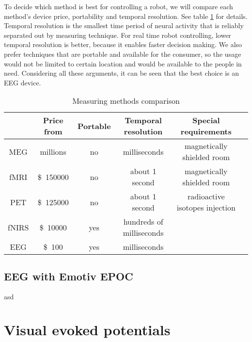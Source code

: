 To decide which method is best for controlling a robot, we will compare each method's device price, portability and temporal resolution. See table \ref{tab:measuring methods} for details. Temporal resolution is the smallest time period of neural activity that is reliably separated out by measuring technique. For real time robot controlling, lower temporal resolution is better, because it enables faster decision making. We also prefer techniques that are portable and available for the consumer, so the usage would not be limited to certain location and would be available to the people in need. Considering all these arguments, it can be seen that the best choice is an \acrshort{EEG} device.
\newpage


\newcommand{\pMEG}{\tablefootnote{http://neurogadget.com/2012/12/15/inexpensive-magnetoencephalography-meg-system-could-be-available-at-every-hospital/6495}}
\newcommand{\pfMRI}{\tablefootnote{http://info.blockimaging.com/bid/92623/MRI-Machine-Cost-and-Price-Guide}}
\newcommand{\pPET}{\tablefootnote{http://info.blockimaging.com/bid/68875/How-Much-Does-a-PET-CT-Scanner-Cost}}
\newcommand{\plEEG}{\tablefootnote{http://en.wikipedia.org/wiki/Comparison\_of\_consumer\_brain-computer\_interfaces}}
\newcommand{\phEEG}{\tablefootnote{http://www.brainvision.com/files/actiCHamp-PyCorder-Flyer\_US.pdf}}
\newcommand{\pNIRS}{\cite{NIRS}}
\newcommand{\tresol}{\cite{timeresol}}


\begin{table}[h]
	\centering
	\begin{tabular}{|c|c|c|c|c|c|}
	\hline
				& Price	from				& Portable	& Temporal resolution 	& Special requirements		\\\hline
MEG				& millions\pMEG				& no	& milliseconds \tresol		& magnetically shielded room\\\hline
fMRI			& \SI{150000}[\$]\pfMRI		& no	& about 1 second \tresol	& magnetically shielded room\\\hline
PET				& \SI{125000}[\$]\pPET		& no	& about 1 second \tresol	& radioactive isotopes injection\\\hline
fNIRS			& \SI{10000}[\$]{} \pNIRS 	& yes	& hundreds of milliseconds \pNIRS&						\\\hline
\acrshort{EEG}	& \SI{100}[\$]\plEEG		& yes	& milliseconds \tresol 		&							\\\hline
	\end{tabular}
	\caption{Measuring methods comparison}
	\label{tab:measuring methods}
\end{table}

\subsection{EEG with Emotiv EPOC}
asd

\section{Visual evoked potentials}
 